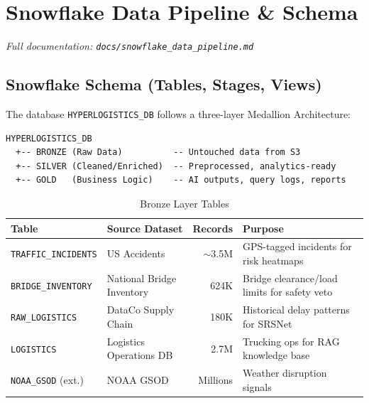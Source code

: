 \documentclass[14.5pt,letterpaper]{article}
\begin{document}

\newpage
\section{Snowflake Data Pipeline \& Schema}
\label{app:snowflake}

\noindent\textit{Full documentation: \texttt{docs/snowflake\_data\_pipeline.md}}

\subsection{Snowflake Schema (Tables, Stages, Views)}

The database \texttt{HYPERLOGISTICS\_DB} follows a three-layer Medallion Architecture:

\begin{lstlisting}[caption={Medallion Architecture layout}]
HYPERLOGISTICS_DB
  +-- BRONZE (Raw Data)          -- Untouched data from S3
  +-- SILVER (Cleaned/Enriched)  -- Preprocessed, analytics-ready
  +-- GOLD   (Business Logic)    -- AI outputs, query logs, reports
\end{lstlisting}

\begin{table}[H]
\centering
\caption{Bronze Layer Tables}
\small
\begin{tabular}{@{}llrl@{}}
\toprule
\textbf{Table} & \textbf{Source Dataset} & \textbf{Records} & \textbf{Purpose} \\
\midrule
\texttt{TRAFFIC\_INCIDENTS} & US Accidents & $\sim$3.5M & GPS-tagged incidents for risk heatmaps \\
\texttt{BRIDGE\_INVENTORY} & National Bridge Inventory & 624K & Bridge clearance/load limits for safety veto \\
\texttt{RAW\_LOGISTICS} & DataCo Supply Chain & 180K & Historical delay patterns for SRSNet \\
\texttt{LOGISTICS} & Logistics Operations DB & 2.7M & Trucking ops for RAG knowledge base \\
\texttt{NOAA\_GSOD} (ext.) & NOAA GSOD & Millions & Weather disruption signals \\
\bottomrule
\end{tabular}
\end{table}
\end{document}
